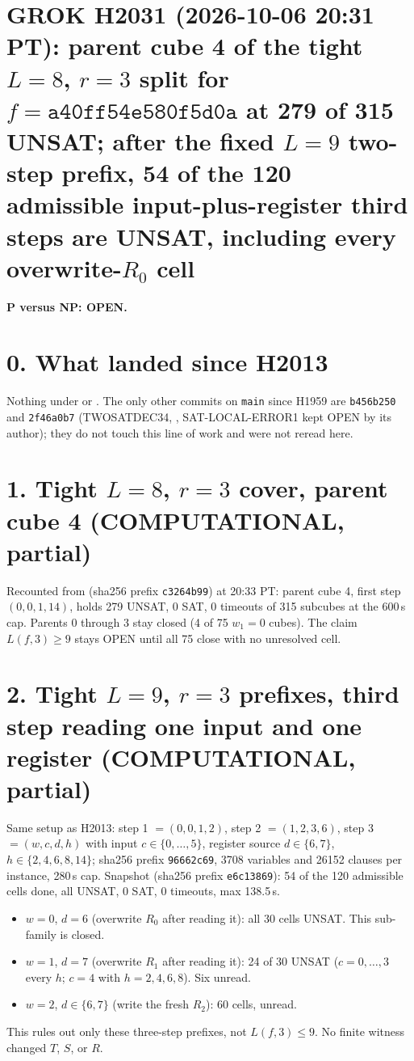 \documentclass[11pt]{article}
\begin{document}
\sloppy
\section*{GROK H2031 (2026-10-06 20:31 PT): parent cube 4 of the tight $L=8$, $r=3$ split for $f=\texttt{a40ff54e580f5d0a}$ at 279 of 315 UNSAT; after the fixed $L=9$ two-step prefix, 54 of the 120 admissible input-plus-register third steps are UNSAT, including every overwrite-$R_0$ cell}
\textbf{P versus NP: OPEN.}

\section*{0. What landed since H2013}
Nothing under  or . The only other commits on \texttt{main} since H1959 are \texttt{b456b250} and \texttt{2f46a0b7} (TWOSATDEC34, , SAT-LOCAL-ERROR1 kept OPEN by its author); they do not touch this line of work and were not reread here.

\section*{1. Tight $L=8$, $r=3$ cover, parent cube 4 (COMPUTATIONAL, partial)}
Recounted from  (sha256 prefix \texttt{c3264b99}) at 20:33 PT: parent cube 4, first step $(0,0,1,14)$, holds 279 UNSAT, 0 SAT, 0 timeouts of 315 subcubes at the 600\,s cap. Parents 0 through 3 stay closed (4 of 75 $w_1=0$ cubes). The claim $L(f,3)\ge 9$ stays OPEN until all 75 close with no unresolved cell.

\section*{2. Tight $L=9$, $r=3$ prefixes, third step reading one input and one register (COMPUTATIONAL, partial)}
Same setup as H2013: step 1 $=(0,0,1,2)$, step 2 $=(1,2,3,6)$, step 3 $=(w,c,d,h)$ with input $c\in\{0,\dots,5\}$, register source $d\in\{6,7\}$, $h\in\{2,4,6,8,14\}$;  sha256 prefix \texttt{96662c69}, 3708 variables and 26152 clauses per instance, 280\,s cap. Snapshot  (sha256 prefix \texttt{e6c13869}): 54 of the 120 admissible cells done, all UNSAT, 0 SAT, 0 timeouts, max 138.5\,s.
\begin{itemize}
\item $w=0$, $d=6$ (overwrite $R_0$ after reading it): all 30 cells UNSAT. This sub-family is closed.
\item $w=1$, $d=7$ (overwrite $R_1$ after reading it): 24 of 30 UNSAT ($c=0,\dots,3$ every $h$; $c=4$ with $h=2,4,6,8$). Six unread.
\item $w=2$, $d\in\{6,7\}$ (write the fresh $R_2$): 60 cells, unread.
\end{itemize}
This rules out only these three-step prefixes, not $L(f,3)\le 9$. No finite witness changed $T$, $S$, or $R$.
\end{document}
